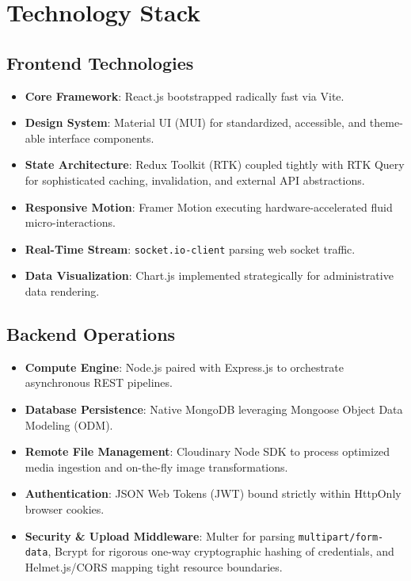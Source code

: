 \documentclass[12pt,a4paper]{article}
\begin{document}
\section{Technology Stack}

\subsection{Frontend Technologies}
\begin{itemize}
    \item \textbf{Core Framework}: React.js bootstrapped radically fast via Vite.
    \item \textbf{Design System}: Material UI (MUI) for standardized, accessible, and theme-able interface components.
    \item \textbf{State Architecture}: Redux Toolkit (RTK) coupled tightly with RTK Query for sophisticated caching, invalidation, and external API abstractions.
    \item \textbf{Responsive Motion}: Framer Motion executing hardware-accelerated fluid micro-interactions.
    \item \textbf{Real-Time Stream}: \texttt{socket.io-client} parsing web socket traffic.
    \item \textbf{Data Visualization}: Chart.js implemented strategically for administrative data rendering.
\end{itemize}

\subsection{Backend Operations}
\begin{itemize}
    \item \textbf{Compute Engine}: Node.js paired with Express.js to orchestrate asynchronous REST pipelines.
    \item \textbf{Database Persistence}: Native MongoDB leveraging Mongoose Object Data Modeling (ODM).
    \item \textbf{Remote File Management}: Cloudinary Node SDK to process optimized media ingestion and on-the-fly image transformations.
    \item \textbf{Authentication}: JSON Web Tokens (JWT) bound strictly within HttpOnly browser cookies.
    \item \textbf{Security \& Upload Middleware}: Multer for parsing \texttt{multipart/form-data}, Bcrypt for rigorous one-way cryptographic hashing of credentials, and Helmet.js/CORS mapping tight resource boundaries.
\end{itemize}
\end{document}
